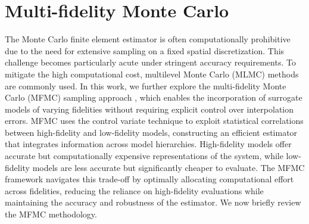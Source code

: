 \section{Multi-fidelity Monte Carlo}\label{sec:MFMC}
The Monte Carlo finite element estimator is often computationally prohibitive due to the need for extensive sampling on a fixed spatial discretization. This challenge becomes particularly acute under stringent accuracy requirements. To mitigate the high computational cost, multilevel Monte Carlo (MLMC) methods \cite{Gi:2008,Gi:2015} are commonly used. In this work, we further explore the multi-fidelity Monte Carlo (MFMC) sampling approach \cite{PeWiGu:2016}, which enables the incorporation of surrogate models of varying fidelities without requiring explicit control over interpolation errors. MFMC uses the control variate technique to exploit statistical correlations between high-fidelity and low-fidelity models, constructing an efficient estimator that integrates information across model hierarchies.  High-fidelity models offer accurate but computationally expensive representations of the system, while low-fidelity models are less accurate but significantly cheaper to evaluate. The MFMC framework navigates this trade-off by optimally allocating computational effort across fidelities, reducing the reliance on high-fidelity evaluations while maintaining the accuracy and robustness of the estimator. We now briefly review the MFMC methodology.



 





